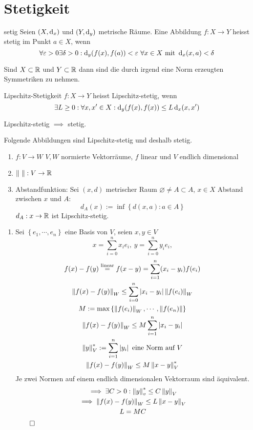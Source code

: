 \section{Stetigkeit}
\begin{Def}{setig}
  Seien $(X,\operatorname{d}_x)$ und $(Y,\operatorname{d}_y)$ metrische Räume. Eine Abbildung $f:X\to Y$ heisst stetig im Punkt $a\in X$, wenn
  \[\forall \varepsilon>0\exists\delta>0:\md_y(f(x),f(a))<\varepsilon\ \forall x\in X\ \text{mit}\ \md_x(x,a)<\delta\]
\end{Def}
\begin{Not}
  Sind $X\subset\mathbb{R}$ und $Y\subset\mathbb{R}$ dann sind die durch irgend eine Norm erzeugten Symmetriken zu nehmen.
\end{Not}
\begin{Def}{Lipschitz-Stetigkeit} $f:X\to Y$ heisst Lipschitz-stetig, wenn
  \[\exists L\geq 0:\forall x,x'\in X:\operatorname{d}_y(f(x),f(x))\leq L\operatorname{d}_x(x,x')\]
\end{Def}
\begin{Lem}
  Lipschitz-stetig $\implies$ stetig.
\end{Lem}
\begin{Bsp}
  Folgende Abbildungen sind Lipschitz-stetig und deshalb stetig.
  \begin{enumerate}
    \item $f:V\to W$ $V,W$ normierte Vektorräume, $f$ linear und $V$ endlich dimensional
    \item $\left\| \  \right\|:V\to\mathbb{R}$
    \item Abstandfunktion: Sei $(x,d)$ metrischer Raum $\varnothing\neq A\subset A$, $x\in X$ Abstand zwischen $x$ und $A$:
      \[d_A(x):=\inf\left\{ d(x,a):a\in A \right\}\]
      $d_A:x\to\mathbb{R}$ ist Lipschitz-stetig.
  \end{enumerate}
  \begin{enumerate}
    \item Sei $\left\{ e_1,\cdots,e_n \right\}$ eine Basis von $V$, seien $x,y\in V$
      \[x=\sum^n_{i=0}x_ie_i,\ y=\sum^n_{i=0}y_ie_i,\]
      \begin{gather*}
        f(x)-f(y)\stackrel{\text{linear}}{=} f(x-y)= \sum^n_{i=1} (x_i-y_i) f(e_i) \\
        \left\| f(x)-f(y) \right\|_W\leq\sum^n_{i=0}\left| x_i-y_i \right|\left\| f(e_i) \right\|_W\\
        M:=\max\left\{ \left\| f(e_i) \right\|_W,\cdots,\left\| f(e_n) \right\| \right\}\\
        \left\| f(x)-f(y) \right\|_W\leq M\sum^n_{i=1}\left| x_i-y_i \right|\\
        \left\| y \right\|^*_V:=\sum^n_{i=1}\left| y_i \right|\ \text{eine Norm auf $V$}\\
        \left\| f(x)-f(y) \right\|_W\leq M\left\| x-y \right\|^*_V
      \end{gather*}
      Je zwei Normen auf einem endlich dimensionalen Vektorraum sind äquivalent.
      \begin{gather*}
        \implies \exists C>0: \left\| y \right\|_v^*\leq C\left\| y \right\|_V\\
        \implies \left\| f(x)-f(y) \right\|_W\leq L\left\| x-y \right\|_V\\
        L=MC
      \end{gather*}
      $\qed$
  \end{enumerate}
\end{Bsp}
